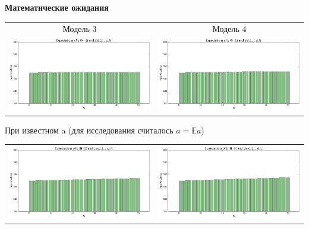 \documentclass[12pt, a4paper]{article}
\begin{document}
\begin{center}
			\textbf{Математические ожидания}
			\begin{tabular}{ c  c }
  				Модель 3 & Модель 4 \\
  				\includegraphics[width=8.5cm]{expec_m3_d_ex.png} &
  				\includegraphics[width=8.5cm]{expec_m4_d_ex.png} \\
  			\end{tabular}
  			При известном a (для исследования считалось $a = \mathbb{E}a$)
  			\begin{tabular}{ c  c }
  				\includegraphics[width=8.5cm]{expec_m3_ad_ex.png} &
  				\includegraphics[width=8.5cm]{expec_m4_ad_ex.png} \\
			\end{tabular}
			

\end{center}
\end{document}
